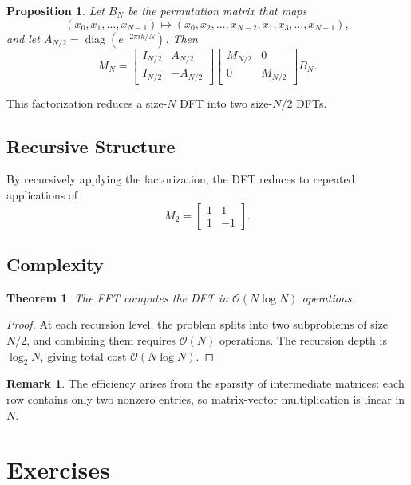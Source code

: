 \documentclass[12pt,oneside]{book}
\numberwithin{equation}{section}
\theoremstyle{definition}
\newtheorem{remark}{Remark}[section]
\theoremstyle{plain}
\newtheorem{theorem}{Theorem}[section]
\newtheorem{proposition}{Proposition}[section]
\theoremstyle{remark}
\newcommand{\diag}{\operatorname{diag}}
\begin{document}
\begin{proposition}
Let $B_N$ be the permutation matrix that maps
\[
(x_0, x_1, \ldots, x_{N-1}) \mapsto (x_0, x_2, \ldots, x_{N-2}, x_1, x_3, \ldots, x_{N-1}),
\]
and let $A_{N/2} = \diag(e^{-2\pi i k/N})$. Then
\[
M_N =
\begin{bmatrix}
I_{N/2} & A_{N/2} \\
I_{N/2} & -A_{N/2}
\end{bmatrix}
\begin{bmatrix}
M_{N/2} & 0 \\
0 & M_{N/2}
\end{bmatrix}
B_N.
\]
\end{proposition}

This factorization reduces a size-$N$ DFT into two size-$N/2$ DFTs.

\subsection{Recursive Structure}

By recursively applying the factorization, the DFT reduces to repeated applications of
\[
M_2 =
\begin{bmatrix}
1 & 1 \\
1 & -1
\end{bmatrix}.
\]

\subsection{Complexity}

\begin{theorem}
The FFT computes the DFT in $\mathcal{O}(N \log N)$ operations.
\end{theorem}

\begin{proof}
At each recursion level, the problem splits into two subproblems of size $N/2$, and combining them requires $\mathcal{O}(N)$ operations. The recursion depth is $\log_2 N$, giving total cost $\mathcal{O}(N \log N)$.
\end{proof}

\begin{remark}
The efficiency arises from the sparsity of intermediate matrices: each row contains only two nonzero entries, so matrix-vector multiplication is linear in $N$.
\end{remark}

\section{Exercises}
\end{document}
